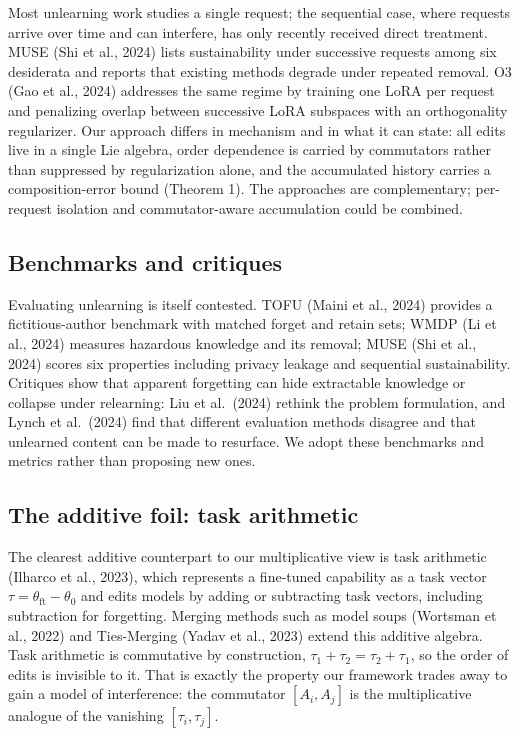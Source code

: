 \documentclass[
]{article}
\begin{document}
Most unlearning work studies a single request; the sequential case, where requests arrive over time and can interfere, has only recently received direct treatment. MUSE (Shi et al., 2024) lists sustainability under successive requests among six desiderata and reports that existing methods degrade under repeated removal. O3 (Gao et al., 2024) addresses the same regime by training one LoRA per request and penalizing overlap between successive LoRA subspaces with an orthogonality regularizer. Our approach differs in mechanism and in what it can state: all edits live in a single Lie algebra, order dependence is carried by commutators rather than suppressed by regularization alone, and the accumulated history carries a composition-error bound (Theorem 1). The approaches are complementary; per-request isolation and commutator-aware accumulation could be combined.

\subsection{Benchmarks and critiques}\label{benchmarks-and-critiques}

Evaluating unlearning is itself contested. TOFU (Maini et al., 2024) provides a fictitious-author benchmark with matched forget and retain sets; WMDP (Li et al., 2024) measures hazardous knowledge and its removal; MUSE (Shi et al., 2024) scores six properties including privacy leakage and sequential sustainability. Critiques show that apparent forgetting can hide extractable knowledge or collapse under relearning: Liu et al.~(2024) rethink the problem formulation, and Lynch et al.~(2024) find that different evaluation methods disagree and that unlearned content can be made to resurface. We adopt these benchmarks and metrics rather than proposing new ones.

\subsection{The additive foil: task arithmetic}\label{the-additive-foil-task-arithmetic}

The clearest additive counterpart to our multiplicative view is task arithmetic (Ilharco et al., 2023), which represents a fine-tuned capability as a task vector \(\tau=\theta_{\mathrm{ft}}-\theta_0\) and edits models by adding or subtracting task vectors, including subtraction for forgetting. Merging methods such as model soups (Wortsman et al., 2022) and Ties-Merging (Yadav et al., 2023) extend this additive algebra. Task arithmetic is commutative by construction, \(\tau_1+\tau_2=\tau_2+\tau_1\), so the order of edits is invisible to it. That is exactly the property our framework trades away to gain a model of interference: the commutator \([A_i,A_j]\) is the multiplicative analogue of the vanishing \([\tau_i,\tau_j]\).
\end{document}
